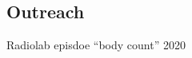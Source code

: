 \documentclass[letterpaper,10pt]{article}
\renewenvironment{itemize}{
  \begin{list}{}{
    \setlength{\leftmargin}{1.5em}
  }
}{
  \end{list}
}
\begin{document}
\subsection*{Outreach}
\begin{itemize}
\item Radiolab episdoe ``body count'' \hfill 2020
\end{itemize}

\end{document}
